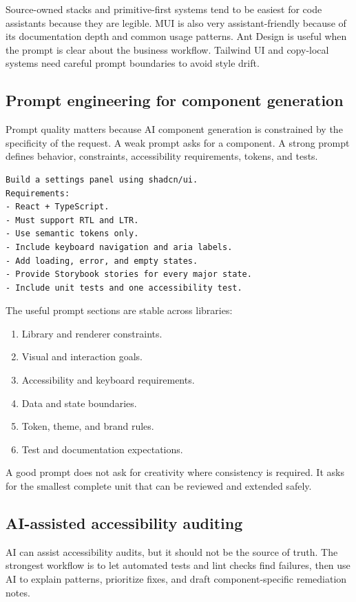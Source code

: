 Source-owned stacks and primitive-first systems tend to be easiest for code assistants because they are legible. MUI is also very assistant-friendly because of its documentation depth and common usage patterns. Ant Design is useful when the prompt is clear about the business workflow. Tailwind UI and copy-local systems need careful prompt boundaries to avoid style drift.

\subsection{Prompt engineering for component generation}
Prompt quality matters because AI component generation is constrained by the specificity of the request. A weak prompt asks for a component. A strong prompt defines behavior, constraints, accessibility requirements, tokens, and tests.

\begin{verbatim}
Build a settings panel using shadcn/ui.
Requirements:
- React + TypeScript.
- Must support RTL and LTR.
- Use semantic tokens only.
- Include keyboard navigation and aria labels.
- Add loading, error, and empty states.
- Provide Storybook stories for every major state.
- Include unit tests and one accessibility test.
\end{verbatim}

The useful prompt sections are stable across libraries:

\begin{enumerate}[leftmargin=*, itemsep=0.35em]
  \item Library and renderer constraints.
  \item Visual and interaction goals.
  \item Accessibility and keyboard requirements.
  \item Data and state boundaries.
  \item Token, theme, and brand rules.
  \item Test and documentation expectations.
\end{enumerate}

A good prompt does not ask for creativity where consistency is required. It asks for the smallest complete unit that can be reviewed and extended safely.

\subsection{AI-assisted accessibility auditing}
AI can assist accessibility audits, but it should not be the source of truth. The strongest workflow is to let automated tests and lint checks find failures, then use AI to explain patterns, prioritize fixes, and draft component-specific remediation notes.

